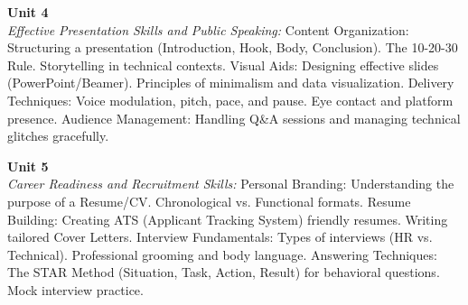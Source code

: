 \vspace{0.3cm}

\noindent\textbf{Unit 4} \\
\textit{Effective Presentation Skills and Public Speaking:} Content Organization: Structuring a presentation (Introduction, Hook, Body, Conclusion). The 10-20-30 Rule. Storytelling in technical contexts. Visual Aids: Designing effective slides (PowerPoint/Beamer). Principles of minimalism and data visualization. Delivery Techniques: Voice modulation, pitch, pace, and pause. Eye contact and platform presence. Audience Management: Handling Q\&A sessions and managing technical glitches gracefully.

\vspace{0.3cm}

\noindent\textbf{Unit 5} \\
\textit{Career Readiness and Recruitment Skills:} Personal Branding: Understanding the purpose of a Resume/CV. Chronological vs. Functional formats. Resume Building: Creating ATS (Applicant Tracking System) friendly resumes. Writing tailored Cover Letters. Interview Fundamentals: Types of interviews (HR vs. Technical). Professional grooming and body language. Answering Techniques: The STAR Method (Situation, Task, Action, Result) for behavioral questions. Mock interview practice.

\newpage
{}